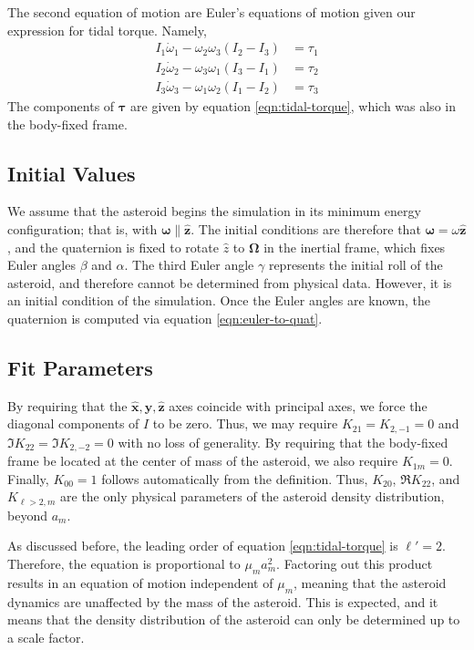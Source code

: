 \documentclass{aastex631}
\newcommand{\unit}[1]{\hat{\mathbf{#1}}}
\begin{document}
The second equation of motion are Euler's equations of motion given our expression for tidal torque. Namely,
\begin{eqnarray}
I_1 \dot \omega_1 - \omega_2 \omega_3 (I_2 - I_3) &= \tau_1\\
I_2 \dot \omega_2 - \omega_3 \omega_1 (I_3 - I_1) &= \tau_2\\
I_3 \dot \omega_3 - \omega_1 \omega_2 (I_1 - I_2) &= \tau_3
\label{eqn:omega-eom}
\end{eqnarray}
The components of $\mathbf \tau$ are given by equation \ref{eqn:tidal-torque}, which was also in the body-fixed frame.


\subsection{Initial Values}
We assume that the asteroid begins the simulation in its minimum energy configuration; that is, with $\mathbf \omega \parallel \unit z$. The initial conditions are therefore that $\mathbf \omega = \omega \unit z$, and the quaternion is fixed to rotate $\hat z$ to $\mathbf \Omega$ in the inertial frame, which fixes Euler angles $\beta$ and $\alpha$. The third Euler angle $\gamma$ represents the initial roll of the asteroid, and therefore cannot be determined from physical data. However, it is an initial condition of the simulation. Once the Euler angles are known, the quaternion is computed via equation \ref{eqn:euler-to-quat}.


\subsection{Fit Parameters}
By requiring that the $\unit x, \unit y, \unit z$ axes coincide with principal axes, we force the diagonal components of $I$ to be zero. Thus, we may require $K_{21}=K_{2,-1}=0$ and $\Im K_{22}=\Im K_{2,-2}=0$ with no loss of generality. By requiring that the body-fixed frame be located at the center of mass of the asteroid, we also require $K_{1m}=0$. Finally, $K_{00}=1$ follows automatically from the definition. Thus, $K_{20}$, $\Re K_{22}$, and $K_{\ell>2, m}$ are the only physical parameters of the asteroid density distribution, beyond $a_m$.

As discussed before, the leading order of equation \ref{eqn:tidal-torque} is $\ell' = 2$. Therefore, the equation is proportional to $\mu_m a_m^2$. Factoring out this product results in an equation of motion independent of $\mu_m$, meaning that the asteroid dynamics are unaffected by the mass of the asteroid. This is expected, and it means that the density distribution of the asteroid can only be determined up to a scale factor.
\end{document}
